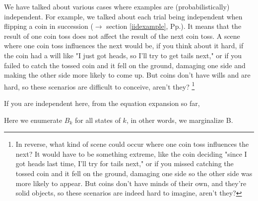 \documentclass{ltjsbook}
\begin{document}
We have talked about various cases where examples are (probabilistically) independent. For example, we talked about each trial being independent when flipping a coin in succession ($\to$ section \ref{iidexample}, Pp.\pageref{iidexample}). It means that the result of one coin toss does not affect the result of the next coin toss. A scene where one coin toss influences the next would be, if you think about it hard, if the coin had a will like "I just got heads, so I'll try to get tails next," or if you failed to catch the tossed coin and it fell on the ground, damaging one side and making the other side more likely to come up. But coins don't have wills and are hard, so these scenarios are difficult to conceive, aren't they? \footnote{In reverse, what kind of scene could occur where one coin toss influences the next? It would have to be something extreme, like the coin deciding "since I got heads last time, I'll try for tails next," or if you missed catching the tossed coin and it fell on the ground, damaging one side so the other side was more likely to appear. But coins don't have minds of their own, and they're solid objects, so these scenarios are indeed hard to imagine, aren’t they?}

If you are independent here, from the equation expansion so far,


Here we enumerate $B_k$ for all states of $k$, in other words, we marginalize B.

\end{document}
